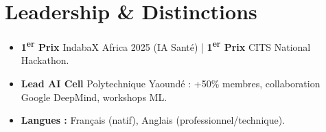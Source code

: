 \documentclass[a4paper,11pt]{article}
\begin{document}
\section{Leadership \& Distinctions}
\begin{itemize}[leftmargin=*, label=\tiny$\bullet$, nosep]
    \item \small{\textbf{1\textsuperscript{er} Prix} IndabaX Africa 2025 (IA Santé) | \textbf{1\textsuperscript{er} Prix} CITS National Hackathon.}
    \item \small{\textbf{Lead AI Cell} Polytechnique Yaoundé : +50\% membres, collaboration Google DeepMind, workshops ML.}
    \item \small{\textbf{Langues :} Français (natif), Anglais (professionnel/technique).}
\end{itemize}
\end{document}
